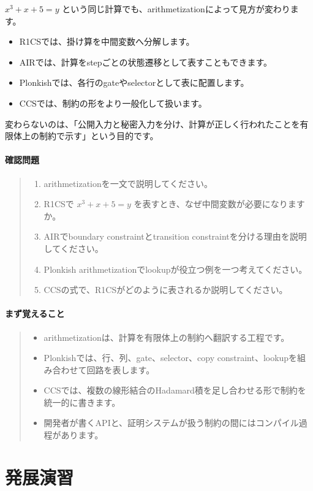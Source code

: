\documentclass[a4paper,11pt]{ltjsarticle}
\newenvironment{keybox}{%
  \paragraph*{まず覚えること}\begin{quote}
}{%
  \end{quote}
}
\newenvironment{checkpointbox}{%
  \paragraph*{確認問題}\begin{quote}
}{%
  \end{quote}
}
\begin{document}
\(x^3+x+5=y\) という同じ計算でも、arithmetizationによって見方が変わります。

\begin{itemize}
  \item R1CSでは、掛け算を中間変数へ分解します。
  \item AIRでは、計算をstepごとの状態遷移として表すこともできます。
  \item Plonkishでは、各行のgateやselectorとして表に配置します。
  \item CCSでは、制約の形をより一般化して扱います。
\end{itemize}

変わらないのは、「公開入力と秘密入力を分け、計算が正しく行われたことを有限体上の制約で示す」という目的です。

\begin{checkpointbox}
\begin{enumerate}
  \item arithmetizationを一文で説明してください。
  \item R1CSで \(x^3+x+5=y\) を表すとき、なぜ中間変数が必要になりますか。
  \item AIRでboundary constraintとtransition constraintを分ける理由を説明してください。
  \item Plonkish arithmetizationでlookupが役立つ例を一つ考えてください。
  \item CCSの式で、R1CSがどのように表されるか説明してください。
\end{enumerate}
\end{checkpointbox}

\begin{keybox}
\begin{itemize}
  \item arithmetizationは、計算を有限体上の制約へ翻訳する工程です。
  \item Plonkishでは、行、列、gate、selector、copy constraint、lookupを組み合わせて回路を表します。
  \item CCSでは、複数の線形結合のHadamard積を足し合わせる形で制約を統一的に書きます。
  \item 開発者が書くAPIと、証明システムが扱う制約の間にはコンパイル過程があります。
\end{itemize}
\end{keybox}

\section{発展演習}
\end{document}
